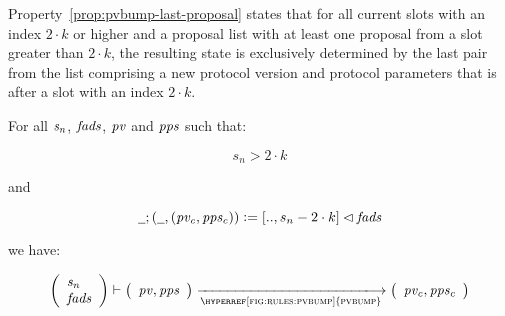 Property~\ref{prop:pvbump-last-proposal} states that for all current slots
with an index $2 \cdot k$ or higher and a proposal list with at least one
proposal from a slot greater than $2 \cdot k$, the resulting state is
exclusively determined by the last pair from the list comprising a new
protocol version and protocol parameters that is after a slot with an index
$2 \cdot k$.

\begin{property}\label{prop:pvbump-last-proposal}
  For all $\mathit{s_n}$, $\mathit{fads}$, $\mathit{pv}$ and $\mathit{pps}$ such that:

  $$s_n > 2 \cdot k$$

  and

  $$
  \wcard ; (\wcard , (\var{pv_c}, \var{pps_c})) \leteq [.., s_n - 2 \cdot k]
  \restrictdom \var{fads}
  $$

  we have:

  $$
  \left(
    \begin{array}{l}
      \var{s_n}\\
      \var{fads}
    \end{array}
  \right)
  \vdash
  \left(
    \begin{array}{l}
      \var{pv}, \var{pps}\\
    \end{array}
  \right)
  \trans{\hyperref[fig:rules:pvbump]{pvbump}}{}
  \left(
    \begin{array}{l}
      \var{pv_c}, \var{pps_c}\\
    \end{array}
  \right)
  $$
\end{property}
